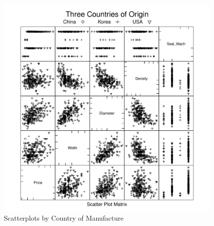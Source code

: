 \documentclass[11pt]{book}
\begin{document}
\begin{figure}[h!]
  \centering
  \includegraphics[scale = 0.5, keepaspectratio=true]{../Figures/slpom_by_country}
  \caption{Scatterplots by Country of Manufacture} \label{fig:slpom_by_country}
\end{figure}




\end{document}
